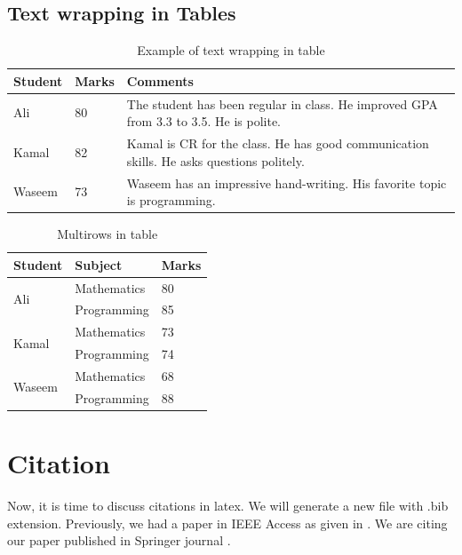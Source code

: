\documentclass[12pt]{article}
\begin{document}
\subsection{Text wrapping in Tables}
\begin{table}[h!]
\centering
\caption{Example of text wrapping in table}
\begin{tabular}{|l|l|p{6cm}|}
\hline
Student & Marks & Comments\\ \hline
Ali & 80 & The student has been regular in class. He improved GPA from 3.3 to 3.5. He is polite. \\ \hline
Kamal & 82 & Kamal is CR for the class. He has good communication skills. He asks questions politely. \\ \hline
Waseem & 73 & Waseem has an impressive hand-writing. His favorite topic is programming.\\ \hline
\end{tabular}
\end{table}
\begin{table}[h!]
\centering
\caption{Multirows in table}
\begin{tabular}{|l|l|l|}
\hline
Student 							& Subject 		& Marks 	\\ \hline
\multirow{2}{*}{Ali} 	& Mathematics & 80 			\\ 
											& Programming & 85 			\\ \hline
\multirow{2}{*}{Kamal}&Mathematics 	& 73			\\ 
											&Programming 	& 74			 \\  \hline
\multirow{2}{*}{Waseem} &Mathematics & 68				\\ 
											&Programming & 88					\\ \hline
\end{tabular}
\end{table}

\section{Citation}
Now, it is time to discuss citations in latex.  We will generate a new file with .bib extension. Previously, we had a paper in IEEE Access as given in \cite{star2}. 
We are citing our paper published in Springer journal \cite{star1}.


\end{document}
